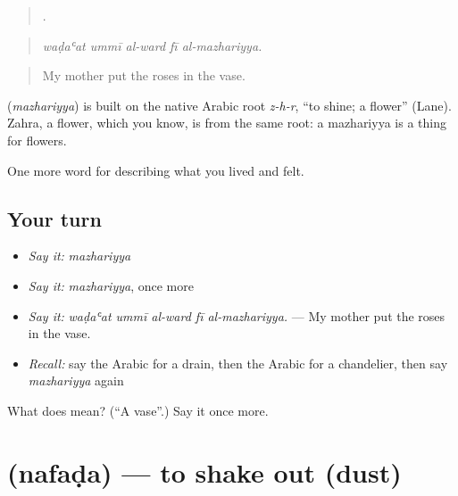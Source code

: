 \begin{quote}
    .
\end{quote}

\begin{quote}
\emph{waḍaʿat ummī al-ward fī al-mazhariyya.}
\end{quote}

\begin{quote}
My mother put the roses in the vase.
\end{quote}

\begin{cousinweb}
\textbf{} (\emph{mazhariyya}) is built on the native Arabic root \emph{z-h-r}, \textquotedblleft{}to shine; a flower\textquotedblright{} (Lane). Zahra, a flower, which you know, is from the same root: a mazhariyya is a thing for flowers.
\end{cousinweb}

\begin{grammarlens}[title={What you've built}]
One more word for describing what you lived and felt.
\end{grammarlens}

\subsection*{Your turn}
\begin{itemize}
\raggedright
  \item \emph{Say it:} \emph{mazhariyya}
  \item \emph{Say it:} \emph{mazhariyya}, once more
  \item \emph{Say it:} \emph{waḍaʿat ummī al-ward fī al-mazhariyya.} — My mother put the roses in the vase.
  \item \emph{Recall:} say the Arabic for a drain, then the Arabic for a chandelier, then say \emph{mazhariyya} again
\end{itemize}

\begin{tcolorbox}[breakable,colback=teal!4,colframe=teal!35!black,title={Before you move on}]
What does  mean? (\textquotedblleft{}A vase\textquotedblright{}.) Say it once more.
\end{tcolorbox}
\section[\texorpdfstring{\ar{نفض} (nafaḍa)}{نفض (nafaḍa)}]{ (nafaḍa) — to shake out (dust)}

